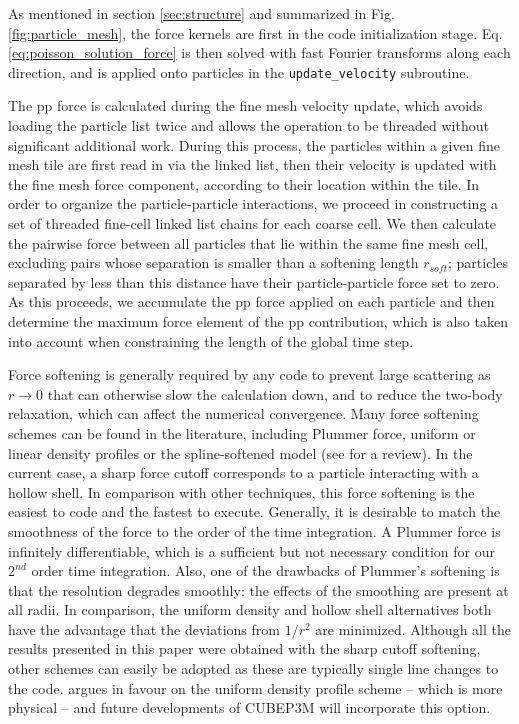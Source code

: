 \documentclass[useAMS,usenatbib]{mn2e}
\begin{document}
As mentioned in section \ref{sec:structure} and summarized in Fig. \ref{fig:particle_mesh},
the force kernels are first  in the code initialization stage.
Eq. \ref{eq:poisson_solution_force} is then solved with fast Fourier transforms along each direction, 
 and is applied onto particles in the {\tt update\_velocity} subroutine.

The pp force is calculated during the fine mesh velocity update, which avoids loading the particle list twice and allows the operation to be threaded without significant additional work. During this process, the particles within a given fine mesh tile are first read in via the linked list, 
then their velocity is updated with the fine mesh force component, according to their location within the tile. 
In order to organize the particle-particle interactions, we proceed in constructing a set of threaded fine-cell linked list chains for each coarse cell. 
We then calculate the pairwise force between all particles that lie within the same fine mesh cell, excluding pairs whose separation is smaller than a softening length $r_{soft}$; particles separated by less than this distance have their 
particle-particle force set to zero.  As this proceeds, we accumulate the  pp force applied on each particle and then determine the maximum force element of the pp contribution, which is also taken into account when constraining the length of the global time step. 

Force softening is generally required by any code to prevent
large scattering as $r \rightarrow 0$ that can otherwise slow the calculation down, 
and to reduce the two-body relaxation, which can affect the numerical convergence. 
Many force softening schemes can be found in the literature, including Plummer force, uniform or linear density profiles or the spline-softened model 
(see \citet{1993ApJ...409...60D} for a review). In the current case, a sharp force cutoff corresponds to a particle interacting with a hollow shell.
In comparison with other techniques, this  force softening is the easiest to code and the fastest to execute. 
Generally, it is desirable to match the smoothness of the force to the order of the time integration. 
A Plummer force is infinitely differentiable, which is a sufficient but not necessary condition for our $2^{nd}$ order time integration.  
Also, one of the drawbacks of Plummer's softening is that the resolution degrades smoothly: the effects of the smoothing are present at all radii. 
In comparison, the uniform density and hollow shell alternatives both have the advantage that the deviations from $1/r^2$ are minimized. 
Although all the results presented in this paper were obtained with the sharp cutoff softening, other schemes can easily be adopted as these 
are typically single line changes to the code. \citet{1993ApJ...409...60D} argues in favour on the uniform density profile scheme -- which is more physical --
and future developments of {\small CUBEP3M} will incorporate this option.
\end{document}
